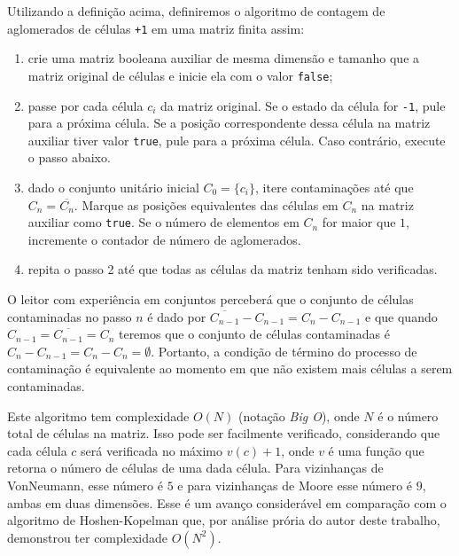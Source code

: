\documentclass[
	12pt,				%
	openright,			%
	twoside,			%
	a4paper,			%
	english,			%
	french,				%
	spanish,			%
	brazil				%
	]{abntex2}
\begin{document}
 Utilizando a definição acima, definiremos o algoritmo de contagem de aglomerados de células \texttt{+1} em uma matriz finita assim: 
\begin{enumerate}
	\item crie uma matriz booleana auxiliar de mesma dimensão e tamanho que a matriz original de células e inicie ela com o valor \texttt{false};
	\item passe por cada célula $c_i$ da matriz original. Se o estado da célula for \texttt{-1}, pule para a próxima célula. Se a posição correspondente dessa célula na matriz auxiliar tiver valor \texttt{true}, pule para a próxima célula. Caso contrário, execute o passo abaixo.
	\item dado o conjunto unitário inicial $C_0=\{c_i\}$, itere contaminações até que $C_n=\overline{C_n}$. Marque as posições equivalentes das células em $C_n$ na matriz auxiliar como \texttt{true}. Se o número de elementos em $C_n$ for maior que $1$, incremente o contador de número de aglomerados.
	\item repita o passo 2 até que todas as células da matriz tenham sido verificadas.
\end{enumerate}

O leitor com experiência em conjuntos perceberá que o conjunto de células contaminadas no passo $n$ é dado por $\overline{C_{n-1}}-C_{n-1}=C_n-C_{n-1}$ e que quando $C_{n-1}=\overline{C_{n-1}}=C_n$ teremos que o conjunto de células contaminadas é $C_n-C_{n-1}=C_n-C_n=\emptyset$. Portanto, a condição de término do processo de contaminação é equivalente ao momento em que não existem mais células a serem contaminadas.

Este algoritmo tem complexidade $O(N)$ (notação \textit{Big O}), onde $N$ é o número total de células na matriz. Isso pode ser facilmente verificado, considerando que cada célula $c$ será verificada no máximo $v(c)+1$, onde $v$ é uma função que retorna o número de células de uma dada célula. Para vizinhanças de VonNeumann, esse número é $5$ e para vizinhanças de Moore esse número é $9$, ambas em duas dimensões. Esse é um avanço considerável em comparação com o algoritmo de  Hoshen-Kopelman que, por análise prória do autor deste trabalho, demonstrou ter complexidade $O(N^2)$.
\end{document}
